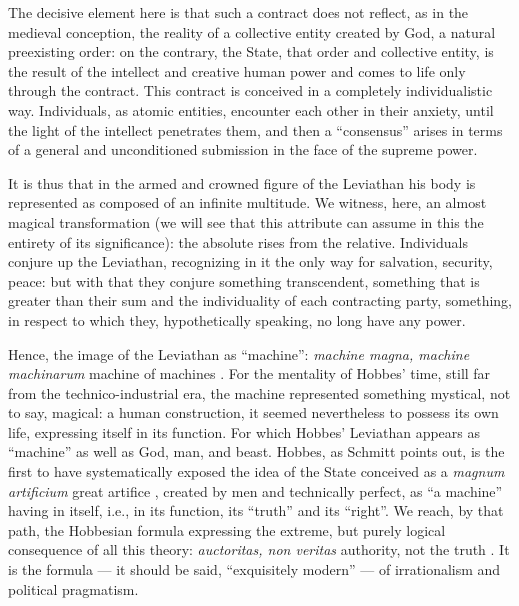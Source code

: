 \begin{quotex}
The decisive element here is that such a contract does not reflect, as in the medieval conception, the reality of a collective entity created by God, a natural preexisting order: on the contrary, the State, that order and collective entity, is the result of the intellect and creative human power and comes to life only through the contract. This contract is conceived in a completely individualistic way. Individuals, as atomic entities, encounter each other in their anxiety, until the light of the intellect penetrates them, and then a ``consensus'' arises in terms of a general and unconditioned submission in the face of the supreme power.
\end{quotex}


It is thus that in the armed and crowned figure of the Leviathan his body is represented as composed of an infinite multitude. We witness, here, an almost magical transformation (we will see that this attribute can assume in this the entirety of its significance): the absolute rises from the relative. Individuals conjure up the Leviathan, recognizing in it the only way for salvation, security, peace: but with that they conjure something transcendent, something that is greater than their sum and the individuality of each contracting party, something, in respect to which they, hypothetically speaking, no long have any power.

Hence, the image of the Leviathan as ``machine'': \emph{machine magna, machine machinarum} machine of machines . For the mentality of Hobbes' time, still far from the technico-industrial era, the machine represented something mystical, not to say, magical: a human construction, it seemed nevertheless to possess its own life, expressing itself in its function. For which Hobbes' Leviathan appears as ``machine'' as well as God, man, and beast. Hobbes, as Schmitt points out, is the first to have systematically exposed the idea of the State conceived as a \emph{magnum artificium} great artifice , created by men and technically perfect, as ``a machine'' having in itself, i.e., in its function, its ``truth'' and its ``right''. We reach, by that path, the Hobbesian formula expressing the extreme, but purely logical consequence of all this theory: \emph{auctoritas, non veritas} authority, not the truth . It is the formula --- it should be said, ``exquisitely modern'' --- of irrationalism and political pragmatism.

